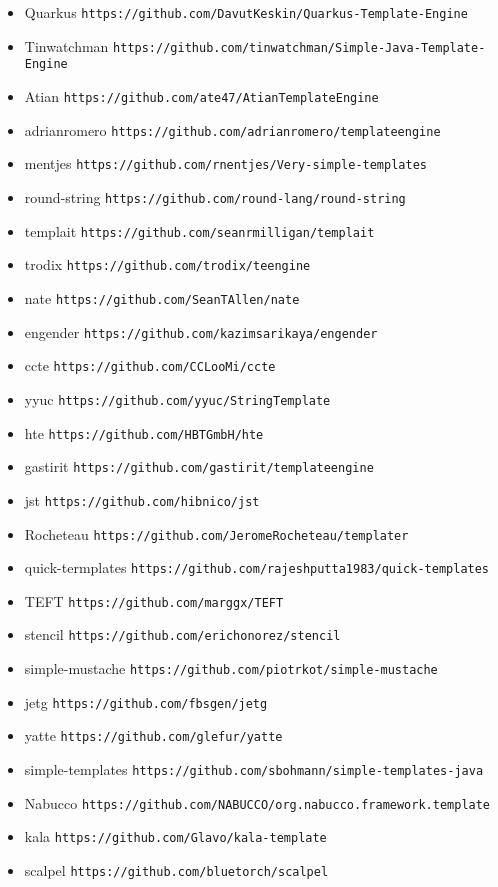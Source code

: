 \begin{singlespace}
\begin{itemize}
\item Quarkus \verb!https://github.com/DavutKeskin/Quarkus-Template-Engine!
\item Tinwatchman \verb!https://github.com/tinwatchman/Simple-Java-Template-Engine!
\item Atian \verb!https://github.com/ate47/AtianTemplateEngine!
\item adrianromero \verb!https://github.com/adrianromero/templateengine!
\item mentjes \verb!https://github.com/rnentjes/Very-simple-templates!
\item round-string \verb!https://github.com/round-lang/round-string!
\item templait \verb!https://github.com/seanrmilligan/templait!
\item trodix \verb!https://github.com/trodix/teengine!
\item nate \verb!https://github.com/SeanTAllen/nate!
\item engender \verb!https://github.com/kazimsarikaya/engender!
\item ccte \verb!https://github.com/CCLooMi/ccte!
\item yyuc \verb!https://github.com/yyuc/StringTemplate!
\item hte \verb!https://github.com/HBTGmbH/hte!
\item gastirit \verb!https://github.com/gastirit/templateengine!
\item jst \verb!https://github.com/hibnico/jst!
\item Rocheteau \verb!https://github.com/JeromeRocheteau/templater!
\item quick-termplates \verb!https://github.com/rajeshputta1983/quick-templates!
\item TEFT \verb!https://github.com/marggx/TEFT!
\item stencil \verb!https://github.com/erichonorez/stencil!
\item simple-mustache \verb!https://github.com/piotrkot/simple-mustache!
\item jetg \verb!https://github.com/fbsgen/jetg!
\item yatte \verb!https://github.com/glefur/yatte!
\item simple-templates \verb!https://github.com/sbohmann/simple-templates-java!
\item Nabucco \verb!https://github.com/NABUCCO/org.nabucco.framework.template!
\item kala \verb!https://github.com/Glavo/kala-template!
\item scalpel \verb!https://github.com/bluetorch/scalpel!

\end{itemize}
\end{singlespace}
